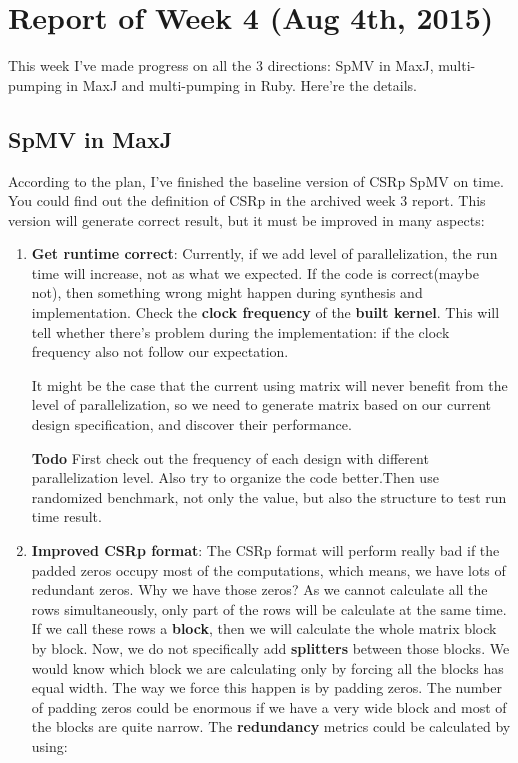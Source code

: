
\section{Report of Week 4 (Aug 4th, 2015)}

This week I've made progress on all the 3 directions: SpMV in MaxJ, multi-pumping in MaxJ and multi-pumping in Ruby. Here're the details.

\subsection{SpMV in MaxJ}
According to the plan, I've finished the baseline version of CSRp SpMV on time. You could find out the definition of CSRp in the archived week 3 report. This version will generate correct result, but it must be improved in many aspects:
\begin{enumerate}
\item 
\textbf{Get runtime correct}: Currently, if we add level of parallelization, the run time will increase, not as what we expected. If the code is correct(maybe not), then something wrong might happen during synthesis and implementation. Check the \textbf{clock frequency} of the \textbf{built kernel}. This will tell whether there's problem during the implementation: if the clock frequency also not follow our expectation.

It might be the case that the current using matrix will never benefit from the level of parallelization, so we need to generate matrix based on our current design specification, and discover their performance.

\textbf{Todo} First check out the frequency of each design with different parallelization level. Also try to organize the code better.Then use randomized benchmark, not only the value, but also the structure to test run time result. 

\item
\textbf{Improved CSRp format}: The CSRp format will perform really bad if the padded zeros occupy most of the computations, which means, we have lots of redundant zeros. Why we have those zeros? As we cannot calculate all the rows simultaneously, only part of the rows will be calculate at the same time. If we call these rows a \textbf{block}, then we will calculate the whole matrix block by block. Now, we do not specifically add \textbf{splitters} between those blocks. We would know which block we are calculating only by forcing all the blocks has equal width. The way we force this happen is by padding zeros. The number of padding zeros could be enormous if we have a very wide block and most of the blocks are quite narrow. The \textbf{redundancy} metrics could be calculated by using:


\end{enumerate}
